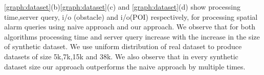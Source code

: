 

\ref{graph:dataset}(b)\ref{graph:dataset}(c) and \ref{graph:dataset}(d) show processing time,server query, i/o (obstacle) and i/o(POI) respectively, for processing spatial alarm queries using naive approach and our approach. We observe that for both algorithms processing time and server query increase with the increase in the size of synthetic dataset. We use uniform distribution of real dataset to produce datasets of size 5k,7k,15k and 38k. We also observe that in every synthetic dataset size our approach outperforms the naive approach by multiple times.

\vspace*{10pt}

